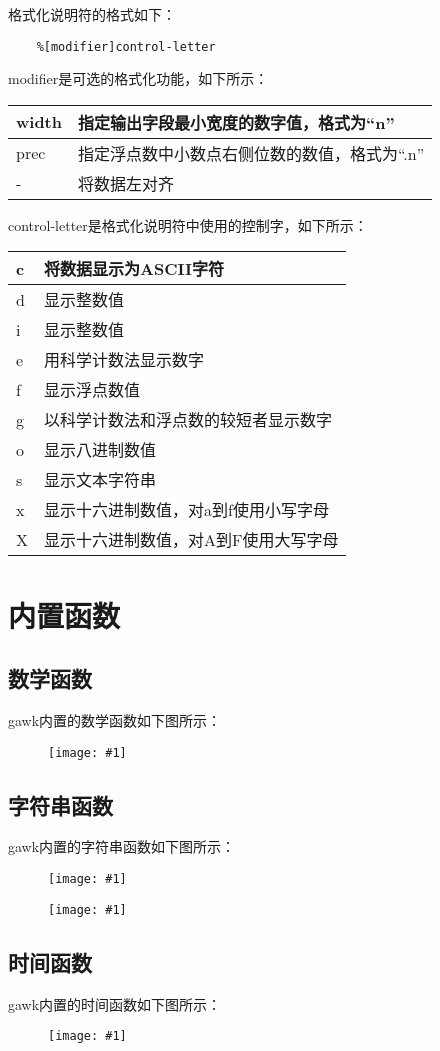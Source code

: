 \documentclass[a4paper,left=2.5cm,right=2.5cm,11pt]{article}
\newcommand{\fic}[1]{\begin{figure}[H]
		\center
		\texttt{[image: \#1]}
	\end{figure}}
\begin{document}
	格式化说明符的格式如下：
	\begin{lstlisting}
	%[modifier]control-letter
	\end{lstlisting}

	modifier是可选的格式化功能，如下所示：
	\begin{longtable}{p{2cm}p{5cm}}
	\hline
	width & 指定输出字段最小宽度的数字值，格式为“n” \\
	\hline
	prec & 指定浮点数中小数点右侧位数的数值，格式为“.n” \\
	\hline
	- & 将数据左对齐 \\
	\hline
	\end{longtable}

	control-letter是格式化说明符中使用的控制字，如下所示：
	\begin{longtable}{p{2cm}p{5cm}}
	\hline
	c & 将数据显示为ASCII字符 \\
	\hline
	d & 显示整数值 \\
	\hline
	i & 显示整数值 \\
	\hline
	e & 用科学计数法显示数字 \\
	\hline
	f & 显示浮点数值 \\
	\hline
	g & 以科学计数法和浮点数的较短者显示数字 \\
	\hline
	o & 显示八进制数值 \\
	\hline
	s & 显示文本字符串 \\
	\hline
	x & 显示十六进制数值，对a到f使用小写字母 \\
	\hline
	X & 显示十六进制数值，对A到F使用大写字母 \\
	\hline
	\end{longtable}

\section{内置函数}
\subsection{数学函数}
	gawk内置的数学函数如下图所示：
	\fic{1.png}

\subsection{字符串函数}
	gawk内置的字符串函数如下图所示：
	\fic{3.png}
	\fic{2.png}

\subsection{时间函数}
	gawk内置的时间函数如下图所示：
	\fic{4.png}
\end{document}
